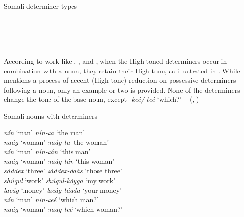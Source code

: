 \documentclass[output=paper]{langscibook}
\begin{document}
\ea  Somali determiner types \citep[111--117]{Saeed1999} \label{ex:downing:2}
  \\
  \\
  \\
  \\
  \\
  \z
\z

According to work like \citet{Green2016}, \citet{Hyman1981}, and \citet{Saeed1993,Saeed1999}, when the High-toned determiners occur in combination with a noun, they retain their High tone, as illustrated in . While \citet[191]{Hyman1981} mentions a process of accent (High tone) reduction on possessive determiners following a noun, only an example or two is provided. None of the determiners change the tone of the base noun, except \textit{{}-keé/-teé} ‘which?’ – (, )


\ea  Somali nouns with determiners \citep[160--168]{Saeed1993} \label{ex:downing:3}

  \ea  \textit{nín}  ‘man’  \textit{nín-ka}  ‘the man’\label{ex:downing:3a}\\
  \ex  \textit{naág}  ‘woman’  \textit{naág-ta}  ‘the woman’ \label{ex:downing:3b}\\
  \ex  \textit{nín}  ‘man’  \textit{nín-kán}  ‘this man’\label{ex:downing:3c}\\
  \ex  \textit{naág}  ‘woman’  \textit{naág-tán}  ‘this woman’\label{ex:downing:3d}\\
  \ex  \textit{sáddex}  ‘three’  \textit{sáddex-daás}   ‘those three’\label{ex:downing:3e}\\
  \ex  \textit{shúqul}  ‘work’  \textit{shúqul-káyga}  ‘my work’\label{ex:downing:3f}\\
  \ex  \textit{lacág}  ‘money’  \textit{lacág-táada}  ‘your money’\label{ex:downing:3g}\\
  \ex  \textit{nín}  ‘man’  \textit{nin-keé}  ‘which man?’\label{ex:downing:3h}\\
  \ex  \textit{naág}  ‘woman’  \textit{naag-teé}  ‘which woman?’\label{ex:downing:3i}\\
  \z
\z
 
\end{document}
